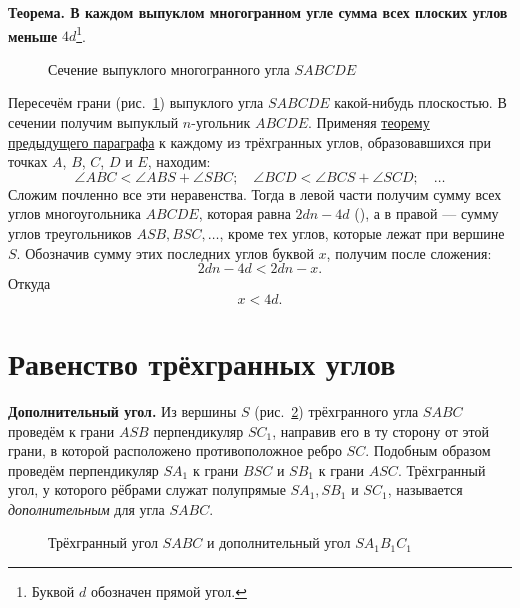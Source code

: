  \textbf{Теорема. В каждом выпуклом многогранном угле сумма всех плоских углов меньше} \(4d\)\footnote{Буквой \(d\) обозначен прямой угол.}.

\begin{figure}[htbp]
    \centering
    \renewcommand{\thefigure}{347}
    \captionsetup{name=Рис.,labelsep=period}
    
    \caption{Сечение выпуклого многогранного угла \(SABCDE\)}\label{fig:kiselev-stereo-347}
\end{figure}

Пересечём грани (рис.~\ref{fig:kiselev-stereo-347}) выпуклого угла \(SABCDE\) какой-нибудь плоскостью. В сечении получим выпуклый \(n\)-угольник \(ABCDE\). Применяя \hyperref[para:trihedral-plane-angle-inequality]{теорему предыдущего параграфа} к каждому из трёхгранных углов, образовавшихся при точках \(A\), \(B\), \(C\), \(D\) и \(E\), находим:
\[
    \angle ABC<\angle ABS+\angle SBC;\quad
    \angle BCD<\angle BCS+\angle SCD;\quad \ldots
\]
Сложим почленно все эти неравенства. Тогда в левой части получим сумму всех углов многоугольника \(ABCDE\), которая равна \(2dn-4d\) (), а в правой --- сумму углов треугольников \(ASB,BSC,\ldots\), кроме тех углов, которые лежат при вершине \(S\). Обозначив сумму этих последних углов буквой \(x\), получим после сложения:
\[
    2dn-4d<2dn-x.
\]
Откуда
\[
    x<4d.
\]


\section*{Равенство трёхгранных углов}

 \textbf{Дополнительный угол.} Из вершины \(S\) (рис.~\ref{fig:kiselev-stereo-348}) трёхгранного угла \(SABC\) проведём к грани \(ASB\) перпендикуляр \(SC_1\), направив его в ту сторону от этой грани, в которой расположено противоположное ребро \(SC\). Подобным образом проведём перпендикуляр \(SA_1\) к грани \(BSC\) и \(SB_1\) к грани \(ASC\). Трёхгранный угол, у которого рёбрами служат полупрямые \(SA_1,SB_1\) и \(SC_1\), называется \emph{дополнительным} для угла \(SABC\).

\begin{figure}[htbp]
    \centering
    \renewcommand{\thefigure}{348}
    \captionsetup{name=Рис.,labelsep=period}
    
    \caption{Трёхгранный угол \(SABC\) и дополнительный угол \(SA_1B_1C_1\)}\label{fig:kiselev-stereo-348}
\end{figure}


